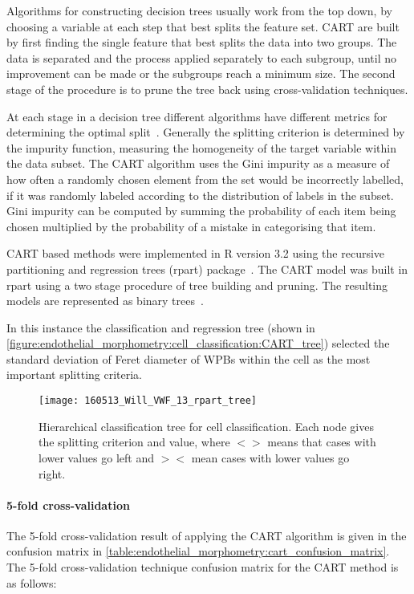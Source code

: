 Algorithms for constructing decision trees usually work from the top down, by choosing a variable at each step that best splits the feature set. CART are built by first finding the single feature that best splits the data into two groups. The data is separated and the process applied separately to each subgroup, until no improvement can be made or the subgroups reach a minimum size. The second stage of the procedure is to prune the tree back using cross-validation techniques.

At each stage in a decision tree different algorithms have different metrics for determining the optimal split~\cite{Rokach2005}. Generally the splitting criterion is determined by the impurity function, measuring the homogeneity of the target variable within the data subset. The CART algorithm uses the Gini impurity as a measure of how often a randomly chosen element from the set would be incorrectly labelled, if it was randomly labeled according to the distribution of labels in the subset. Gini impurity can be computed by summing the probability of each item being chosen multiplied by the probability of a mistake in categorising that item.

CART based methods were implemented in R version 3.2 using the recursive partitioning and regression trees (rpart) package~\cite{Therneau2015}. The CART model was built in rpart using a two stage procedure of tree building and pruning. The resulting models are represented as binary trees~\cite{Duda2000}.

In this instance the classification and regression tree (shown in \autoref{figure:endothelial_morphometry:cell_classification:CART_tree}) selected the standard deviation of Feret diameter of WPBs within the cell as the most important splitting criteria.

\begin{figure}[htbp!]
	\centering
	\texttt{[image: 160513\_Will\_VWF\_13\_rpart\_tree]}
	\caption[CART hierarchical tree]{Hierarchical classification tree for cell classification. Each node gives the splitting criterion and value, where $<>$ means that cases with lower values go left and $><$ mean cases with lower values go right.}
	\label{figure:endothelial_morphometry:cell_classification:CART_tree}
\end{figure}

\paragraph{5-fold cross-validation}
The 5-fold cross-validation result of applying the CART algorithm is given in the confusion matrix in \autoref{table:endothelial_morphometry:cart_confusion_matrix}.
The 5-fold cross-validation technique confusion matrix for the CART method is as follows:

